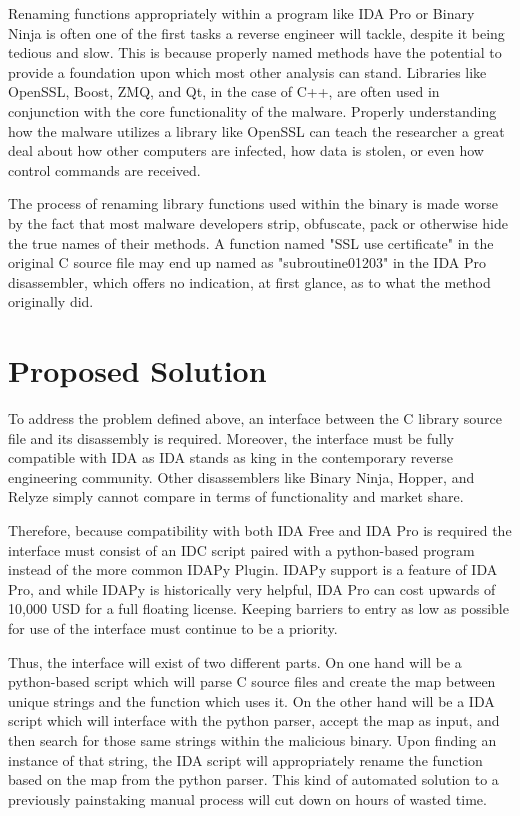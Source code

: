\documentclass[10pt, draftclsnofoot, letterpaper, margin=.75in, onecolumn]{IEEEtran}
\begin{document}
\par Renaming functions appropriately within a program like IDA Pro or Binary Ninja is often one of the first tasks a reverse engineer will tackle, despite it being tedious and slow. This is because properly named methods have the potential to provide a foundation upon which most other analysis can stand. Libraries like OpenSSL, Boost, ZMQ, and Qt, in the case of C++, are often used in conjunction with the core functionality of the malware. Properly understanding how the malware utilizes a library like OpenSSL can teach the researcher a great deal about how other computers are infected, how data is stolen, or even how control commands are received.\\

\par The process of renaming library functions used within the binary is made worse by the fact that most malware developers strip, obfuscate, pack or otherwise hide the true names of their methods. A function named "SSL use certificate" in the original C source file may end up named as "subroutine01203" in the IDA Pro disassembler, which offers no indication, at first glance, as to what the method originally did.\\

\section{Proposed Solution}
To address the problem defined above, an interface between the C library source file and its disassembly is required. Moreover, the interface must be fully compatible with IDA as IDA stands as king in the contemporary reverse engineering community. Other disassemblers like Binary Ninja, Hopper, and Relyze simply cannot compare in terms of functionality and market share.\\

\par Therefore, because compatibility with both IDA Free and IDA Pro is required the interface must consist of an IDC script paired with a python-based program instead of the more common IDAPy Plugin. IDAPy support is a feature of IDA Pro, and while IDAPy is historically very helpful, IDA Pro can cost upwards of 10,000 USD for a full floating license. Keeping barriers to entry as low as possible for use of the interface must continue to be a priority.\\

\par Thus, the interface will exist of two different parts. On one hand will be a python-based script which will parse C source files and create the map between unique strings and the function which uses it. On the other hand will be a IDA script which will interface with the python parser, accept the map as input, and then search for those same strings within the malicious binary. Upon finding an instance of that string, the IDA script will appropriately rename the function based on the map from the python parser. This kind of  automated solution to a previously painstaking manual process will cut down on hours of wasted time.
\end{document}
